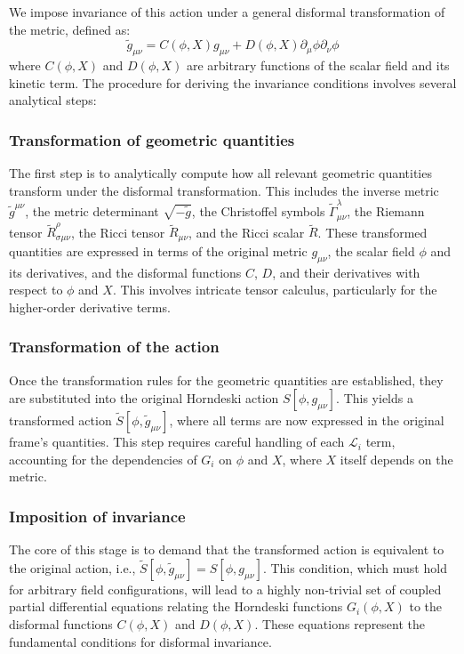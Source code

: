 \documentclass[twocolumn]{aastex631}
\begin{document}
We impose invariance of this action under a general disformal transformation of the metric, defined as:
$$ \tilde{g}_{\mu\nu} = C(\phi, X) g_{\mu\nu} + D(\phi, X) \partial_\mu \phi \partial_\nu \phi $$
where $C(\phi, X)$ and $D(\phi, X)$ are arbitrary functions of the scalar field and its kinetic term. The procedure for deriving the invariance conditions involves several analytical steps:

\subsubsection{Transformation of geometric quantities}
The first step is to analytically compute how all relevant geometric quantities transform under the disformal transformation. This includes the inverse metric $\tilde{g}^{\mu\nu}$, the metric determinant $\sqrt{-\tilde{g}}$, the Christoffel symbols $\tilde{\Gamma}^\lambda_{\mu\nu}$, the Riemann tensor $\tilde{R}^\rho_{\sigma\mu\nu}$, the Ricci tensor $\tilde{R}_{\mu\nu}$, and the Ricci scalar $\tilde{R}$. These transformed quantities are expressed in terms of the original metric $g_{\mu\nu}$, the scalar field $\phi$ and its derivatives, and the disformal functions $C$, $D$, and their derivatives with respect to $\phi$ and $X$. This involves intricate tensor calculus, particularly for the higher-order derivative terms.

\subsubsection{Transformation of the action}
Once the transformation rules for the geometric quantities are established, they are substituted into the original Horndeski action $S[\phi, g_{\mu\nu}]$. This yields a transformed action $\tilde{S}[\phi, \tilde{g}_{\mu\nu}]$, where all terms are now expressed in the original frame's quantities. This step requires careful handling of each $\mathcal{L}_i$ term, accounting for the dependencies of $G_i$ on $\phi$ and $X$, where $X$ itself depends on the metric.

\subsubsection{Imposition of invariance}
The core of this stage is to demand that the transformed action is equivalent to the original action, i.e., $\tilde{S}[\phi, \tilde{g}_{\mu\nu}] = S[\phi, g_{\mu\nu}]$. This condition, which must hold for arbitrary field configurations, will lead to a highly non-trivial set of coupled partial differential equations relating the Horndeski functions $G_i(\phi, X)$ to the disformal functions $C(\phi, X)$ and $D(\phi, X)$. These equations represent the fundamental conditions for disformal invariance.
\end{document}
